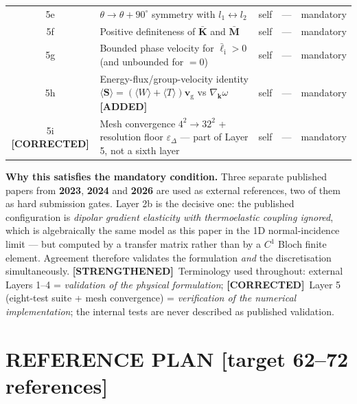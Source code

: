 \documentclass[11pt,a4paper]{article}
\newcommand{\bp}[1]{\textcolor{accent}{\textsf{\footnotesize [#1]}}}
\newcommand{\ADDED}{{\color{addcol}\textbf{[ADDED]}}}
\newcommand{\STR}{{\color{strcol}\textbf{[STRENGTHENED]}}}
\newcommand{\COR}{{\color{corcol}\textbf{[CORRECTED]}}}
\begin{document}
\begin{xltabular}{\textwidth}{@{}c L{5.0cm} L{2.6cm} c Y@{}}
5e & $\theta\to\theta+90^\circ$ symmetry with $l_1\leftrightarrow l_2$ & self & --- & mandatory \\
5f & Positive definiteness of $\bar{\bm K}$ and $\bar{\bm M}$ & self & --- & mandatory \\
5g & Bounded phase velocity for $\bar\ell_{\mathrm i}>0$ (and unbounded for $=0$) & self & --- & mandatory \\
5h & Energy-flux/group-velocity identity $\langle\bm S\rangle=(\langle W\rangle+\langle T\rangle)\bm v_{\mathrm g}$ vs $\nabla_{\bm k}\omega$ \ADDED & self & --- & mandatory \\
5i \COR & Mesh convergence $4^2\!\to\!32^2$ + resolution floor $\varepsilon_\Delta$ --- part of Layer 5, not a sixth layer & self & --- & mandatory \\
\bottomrule
\end{xltabular}



\medskip
\textbf{\color{ok}Why this satisfies the mandatory condition.} Three separate published
papers from \textbf{2023}, \textbf{2024} and \textbf{2026} are used as external references,
two of them as hard submission gates. Layer 2b is the decisive one: the published
configuration is \emph{dipolar gradient elasticity with thermoelastic coupling ignored},
which is algebraically the same model as this paper in the 1D normal-incidence limit ---
but computed by a transfer matrix rather than by a $C^1$ Bloch finite element.
Agreement therefore validates the formulation \emph{and} the discretisation simultaneously.
\STR\ Terminology used throughout: external Layers 1--4 = \emph{validation of the physical formulation}; \COR\ Layer 5 (eight-test suite + mesh convergence) = \emph{verification of the numerical implementation}; the internal tests are never described as published validation.

\newpage
\section{REFERENCE PLAN \bp{target 62--72 references}}
\end{document}
